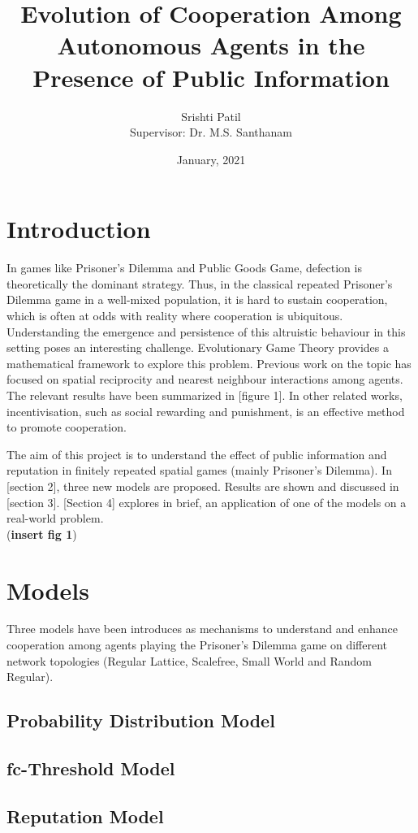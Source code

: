 \documentclass[11pt, A4 paper, twocolumn ]{article}
\title{{\Huge Evolution of Cooperation Among Autonomous Agents in the Presence of Public Information} }
\author{Srishti Patil\\ Supervisor: Dr. M.S. Santhanam}
\date{January, 2021}
\begin{document}
	\maketitle
	\thispagestyle{firstpage}
	\section{Introduction}
	\par
	In games like Prisoner's Dilemma and Public Goods Game, defection is theoretically the dominant strategy. Thus, in the classical repeated Prisoner's Dilemma game in a well-mixed population, it is hard to sustain cooperation, which is often at odds with reality where cooperation is ubiquitous. Understanding the emergence and persistence of this altruistic behaviour in this setting poses an interesting challenge. Evolutionary Game Theory provides a mathematical framework to explore this problem. Previous work on the topic has focused on spatial reciprocity and nearest neighbour interactions among agents. The relevant results have been summarized in [figure 1].  In other related works, incentivisation, such as social rewarding and punishment, is an effective method to promote cooperation.\par
	The aim of this project is to understand the effect of public information and reputation in finitely repeated spatial games (mainly Prisoner's Dilemma). In [section 2], three new models are proposed. Results are shown and discussed in [section 3]. [Section 4] explores in brief, an application of one of the models on a real-world problem.\\
	(\textbf{insert fig 1}) \\
	
	\section{Models}
	\par
	Three models have been introduces as mechanisms to understand and enhance cooperation among agents playing the Prisoner's Dilemma game on different network topologies (Regular Lattice, Scalefree, Small World and Random Regular). 
	
	\subsection{Probability Distribution Model}
	\subsection{fc-Threshold Model}
	\subsection{Reputation Model}
	\lipsum
\end{document}
